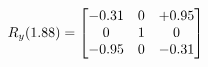 \documentclass[preview]{standalone}
\begin{document}
\begin{align*}
\special{dvisvgm:raw <g id='unique000'>}R_{y}(1.88) = \begin{bmatrix}-0.31 & 0 & +0.95 \\0 & 1 & 0 \\-0.95 & 0 & -0.31\end{bmatrix}\special{dvisvgm:raw </g>}
\end{align*}
\end{document}
